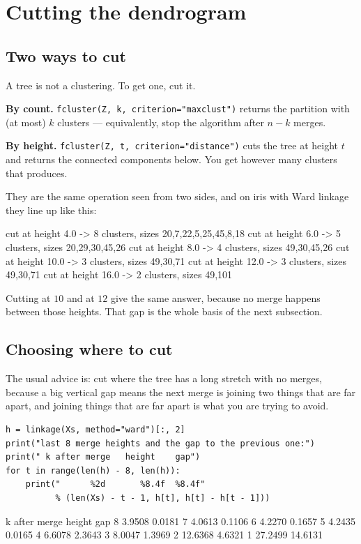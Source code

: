 \documentclass[11pt]{article}
\begin{document}
\section{Cutting the dendrogram}
\label{sec:cut}

\subsection{Two ways to cut}

A tree is not a clustering. To get one, cut it.

\textbf{By count.} \texttt{fcluster(Z, k, criterion="maxclust")} returns the
partition with (at most) $k$ clusters --- equivalently, stop the algorithm
after $n-k$ merges.

\textbf{By height.} \texttt{fcluster(Z, t, criterion="distance")} cuts the
tree at height $t$ and returns the connected components below. You get however
many clusters that produces.

They are the same operation seen from two sides, and on iris with Ward linkage
they line up like this:

\begin{codeout}
  cut at height   4.0 -> 8 clusters, sizes 20,7,22,5,25,45,8,18
  cut at height   6.0 -> 5 clusters, sizes 20,29,30,45,26
  cut at height   8.0 -> 4 clusters, sizes 49,30,45,26
  cut at height  10.0 -> 3 clusters, sizes 49,30,71
  cut at height  12.0 -> 3 clusters, sizes 49,30,71
  cut at height  16.0 -> 2 clusters, sizes 49,101
\end{codeout}

Cutting at $10$ and at $12$ give the same answer, because no merge happens
between those heights. That gap is the whole basis of the next subsection.

\subsection{Choosing where to cut}

The usual advice is: cut where the tree has a long stretch with no merges,
because a big vertical gap means the next merge is joining two things that are
far apart, and joining things that are far apart is what you are trying to
avoid.

\begin{lstlisting}
h = linkage(Xs, method="ward")[:, 2]
print("last 8 merge heights and the gap to the previous one:")
print(" k after merge   height    gap")
for t in range(len(h) - 8, len(h)):
    print("      %2d       %8.4f  %8.4f"
          % (len(Xs) - t - 1, h[t], h[t] - h[t - 1]))
\end{lstlisting}
\begin{codeout}
 k after merge   height    gap
       8         3.9508    0.0181
       7         4.0613    0.1106
       6         4.2270    0.1657
       5         4.2435    0.0165
       4         6.6078    2.3643
       3         8.0047    1.3969
       2        12.6368    4.6321
       1        27.2499   14.6131
\end{codeout}
\end{document}
